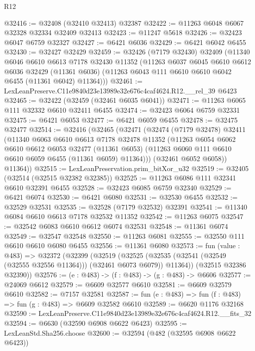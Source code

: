 \begin{lexlean}{R12}
\begin{coremodule}
@32416 := @32408 (@32410 @32413) @32387
@32422 := @11263 @6048 @6067 @32328 @32334 @32409 @32413
@32423 := @11247 @5618
@32426 := @32423 @6047 @6759 @32327
@32427 := @6421 @6036
@32429 := @6421 @6042 @6455
@32430 := @32427 @32429
@32459 := @32426
    (@7179 @32430)
    @32409
    (@11340
      @6046
      @6610
      @6613
      @7178
      @32430
      @11352
      (@11263
        @6037
        @6045
        @6610
        @6612
        @6036
        @32429
        (@11361 @6036)
        (@11263 @6043 @111 @6610 @6610 @6042 @6455 (@11361 @6042) @11364)))
@32461 := LexLeanPreserve.C11e9840d23e13989e32e676c4caf4624.R12.__rel_39 @6423
@32465 := @32422 (@32459 (@32461 @6035 @6041))
@32471 := @11263 @6065 @111 @32332 @6610 @32411 @6455
@32474 := @32423 @6064 @6759 @32331
@32475 := @6421 @6053
@32477 := @6421 @6059 @6455
@32478 := @32475 @32477
@32514 := @32416
    (@32465
      (@32471
        (@32474
          (@7179 @32478)
          @32411
          (@11340
            @6063
            @6610
            @6613
            @7178
            @32478
            @11352
            (@11263
              @6054
              @6062
              @6610
              @6612
              @6053
              @32477
              (@11361 @6053)
              (@11263 @6060 @111 @6610 @6610 @6059 @6455 (@11361 @6059) @11364)))
          (@32461 @6052 @6058))
        @11364))
@32515 := LexLeanPreservation.prim_bitXor_u32
@32519 := @32405 (@32514 (@32515 @32382 @32385))
@32525 := @11263 @6086 @111 @32341 @6610 @32391 @6455
@32528 := @32423 @6085 @6759 @32340
@32529 := @6421 @6074
@32530 := @6421 @6080
@32531 := @32530 @6455
@32532 := @32529 @32531
@32535 := @32528 (@7179 @32532) @32391
@32541 := @11340 @6084 @6610 @6613 @7178 @32532 @11352
@32542 := @11263 @6075
@32547 := @32542 @6083 @6610 @6612 @6074 @32531
@32548 := @11361 @6074
@32549 := @32547 @32548
@32550 := @11263 @6081
@32555 := @32550 @111 @6610 @6610 @6080 @6455
@32556 := @11361 @6080
@32573 := fun (value : @483) =>
  @32372
    (@32399
      (@32519
        (@32525 (@32535 (@32541 (@32549 (@32555 @32556 @11364))) (@32461 @6073 @6079)) @11364))
      (@32515 @32386 @32390))
@32576 := (e : @483) -> (f : @483) -> (g : @483) -> @6606
@32577 := @24069 @6612
@32579 := @6609 @32577 @6610
@32581 := @6609 @32579 @6610
@32582 := @7157 @32581
@32587 := fun (e : @483) => fun (f : @483) => fun (g : @483) => @6609 @32582 @6610
@32589 := @6620 @1176 @32168
@32590 := LexLeanPreserve.C11e9840d23e13989e32e676c4caf4624.R12.__fits_32
@32594 := @6630 (@32590 @6908 @6622 @6423)
@32595 := LexLeanStd.Sha256.choose
@32600 := @32594 (@482 (@32595 @6908 @6622 @6423))

\end{coremodule}
\end{lexlean}
